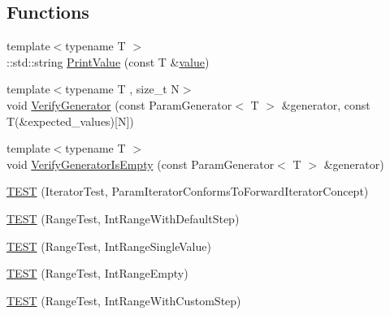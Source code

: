 \subsection*{Functions}
\begin{DoxyCompactItemize}
\item 
{\footnotesize template$<$typename T $>$ }\\\+::std\+::string \mbox{\hyperlink{_obj__test_2lib_2googletest-release-1_88_81_2googletest_2test_2googletest-param-test-test_8cc_a4f874f103b3979e50bc676c7f6414dfc}{Print\+Value}} (const T \&\mbox{\hyperlink{_obj__test_2lib_2googletest-master_2googlemock_2test_2gmock-matchers__test_8cc_a337b8a670efc0b086ad3af163f3121b6}{value}})
\item 
{\footnotesize template$<$typename T , size\+\_\+t N$>$ }\\void \mbox{\hyperlink{_obj__test_2lib_2googletest-release-1_88_81_2googletest_2test_2googletest-param-test-test_8cc_a11c99cfbf44746868aa44105130887f7}{Verify\+Generator}} (const Param\+Generator$<$ T $>$ \&generator, const T(\&expected\+\_\+values)\mbox{[}N\mbox{]})
\item 
{\footnotesize template$<$typename T $>$ }\\void \mbox{\hyperlink{_obj__test_2lib_2googletest-release-1_88_81_2googletest_2test_2googletest-param-test-test_8cc_a85d74de6e554738555812410476b4eec}{Verify\+Generator\+Is\+Empty}} (const Param\+Generator$<$ T $>$ \&generator)
\item 
\mbox{\hyperlink{_obj__test_2lib_2googletest-release-1_88_81_2googletest_2test_2googletest-param-test-test_8cc_a884488b4ac035aaa0e1f799243479538}{T\+E\+ST}} (Iterator\+Test, Param\+Iterator\+Conforms\+To\+Forward\+Iterator\+Concept)
\item 
\mbox{\hyperlink{_obj__test_2lib_2googletest-release-1_88_81_2googletest_2test_2googletest-param-test-test_8cc_aa1294eff6c7aea20468f93a70e6b157d}{T\+E\+ST}} (Range\+Test, Int\+Range\+With\+Default\+Step)
\item 
\mbox{\hyperlink{_obj__test_2lib_2googletest-release-1_88_81_2googletest_2test_2googletest-param-test-test_8cc_acce71b74b2d6f3c2d456e37fd62769a9}{T\+E\+ST}} (Range\+Test, Int\+Range\+Single\+Value)
\item 
\mbox{\hyperlink{_obj__test_2lib_2googletest-release-1_88_81_2googletest_2test_2googletest-param-test-test_8cc_a905a71adae7909d42426aa13b7da5ede}{T\+E\+ST}} (Range\+Test, Int\+Range\+Empty)
\item 
\mbox{\hyperlink{_obj__test_2lib_2googletest-release-1_88_81_2googletest_2test_2googletest-param-test-test_8cc_a806821fc992661b6da02005f57482fd8}{T\+E\+ST}} (Range\+Test, Int\+Range\+With\+Custom\+Step)

\end{DoxyCompactItemize}

